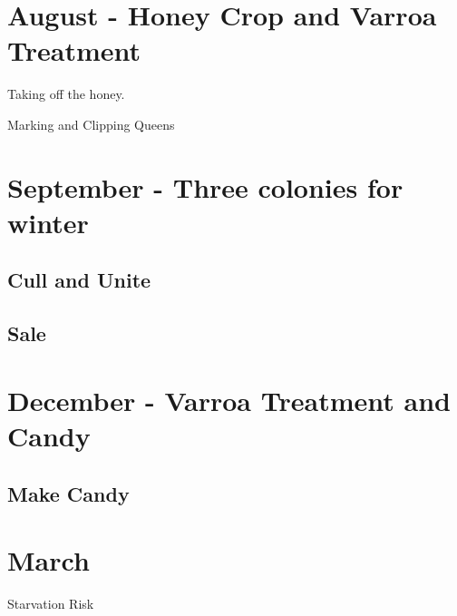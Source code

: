 \documentclass[12pt, a4paper, twoside, british]{article}
\begin{document}
 
\section{August - Honey Crop and Varroa Treatment}

Taking off the honey.

Marking and Clipping Queens


\section{September - Three colonies for winter}

\subsection{Cull and Unite}


\subsection{Sale}

\section{December - Varroa Treatment and Candy}

\subsection{Make Candy}




\section{March}{Starvation Risk}
 
\end{document}
